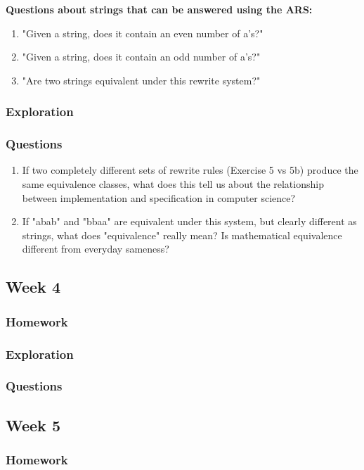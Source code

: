\documentclass{article}
\theoremstyle{theorem}
\theoremstyle{definition}
\theoremstyle{remark}
\begin{document}
\textbf{Questions about strings that can be answered using the ARS:}
\begin{enumerate}
\item "Given a string, does it contain an even number of a's?"
\item "Given a string, does it contain an odd number of a's?"
\item "Are two strings equivalent under this rewrite system?"
\end{enumerate}

\subsubsection{Exploration}
\subsubsection{Questions}
\begin{enumerate}
\item If two completely different sets of rewrite rules (Exercise 5 vs 5b) produce the same equivalence classes, what does this tell us about the relationship between implementation and specification in computer science?

\item If "abab" and "bbaa" are equivalent under this system, but clearly different as strings, what does "equivalence" really mean? Is mathematical equivalence different from everyday sameness?

\end{enumerate}

\subsection{Week 4}
\subsubsection{Homework}
\subsubsection{Exploration}
\subsubsection{Questions}

\subsection{Week 5}
\subsubsection{Homework}
\end{document}

